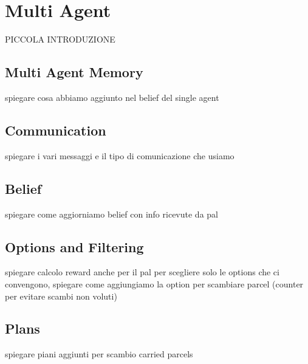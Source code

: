 \section{Multi Agent}

    PICCOLA INTRODUZIONE

    \subsection{Multi Agent Memory}
        spiegare cosa abbiamo aggiunto nel belief del single agent

    \subsection{Communication}
        spiegare i vari messaggi e il tipo di comunicazione che usiamo

    \subsection{Belief}
        spiegare come aggiorniamo belief con info ricevute da pal

    \subsection{Options and Filtering}
        spiegare calcolo reward anche per il pal per scegliere solo le options che ci convengono, spiegare come aggiungiamo la option per scambiare parcel (counter per evitare scambi non voluti)

    \subsection{Plans}
        spiegare piani aggiunti per scambio carried parcels 
        